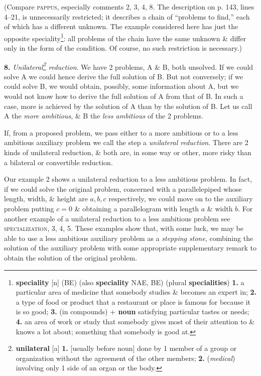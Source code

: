 \documentclass[oneside]{book}
\numberwithin{equation}{section}
\begin{document}
(Compare \textsc{pappus}, especially comments 2, 3, 4, 8. The description on p. 143, lines 4--21, is unnecessarily restricted; it describes a chain of ``problems to find,'' each of which has a different unknown. The example considered here has just the opposite speciality\footnote{\textbf{speciality} [n] (BE) (also \textbf{speciality} NAE, BE) (plural \textbf{specialities}) \textbf{1.} a particular area of medicine that somebody studies \& becomes an expert in; \textbf{2.} a type of food or product that a restaurant or place is famous for because it is so good; \textbf{3.} (in compounds) \textbf{$+$ noun} satisfying particular tastes or needs; \textbf{4.} an area of work or study that somebody gives most of their attention to \& knows a lot about; something that somebody is good at.}: all problems of the chain have the same unknown \& differ only in the form of the condition. Of course, no such restriction is necessary.)

\textbf{8.} \textit{Unilateral\footnote{\textbf{unilateral} [a] \textbf{1.} [usually before noun] done by 1 member of a group or organization without the agreement of the other members; \textbf{2.} (\textit{medical}) involving only 1 side of an organ or the body.} reduction}. We have 2 problems, A \& B, both unsolved. If we could solve A we could hence derive the full solution of B. But not conversely; if we could solve B, we would obtain, possibly, some information about A, but we would not know how to derive the full solution of A from that of B. In such a case, more is achieved by the solution of A than by the solution of B. Let us call A the \textit{more ambitious}, \& B the \textit{less ambitious} of the 2 problems.

If, from a proposed problem, we pass either to a more ambitious or to a less ambitious auxiliary problem we call the step a \textit{unilateral reduction}. There are 2 kinds of unilateral reduction, \& both are, in some way or other, more risky than a bilateral or convertible reduction.

Our example 2 shows a unilateral reduction to a less ambitious problem. In fact, if we could solve the original problem, concerned with a parallelepiped whose length, width, \& height are $a,b,c$ respectively, we could move on to the auxiliary problem putting $c = 0$ \& obtaining a parallelogram with length $a$ \& width $b$. For another example of a unilateral reduction to a less ambitious problem see \textsc{specialization}, 3, 4, 5. These examples show that, with some luck, we may be able to use a less ambitious auxiliary problem as a \textit{stepping stone}, combining the solution of the auxiliary problem with some appropriate supplementary remark to obtain the solution of the original problem.
\end{document}
